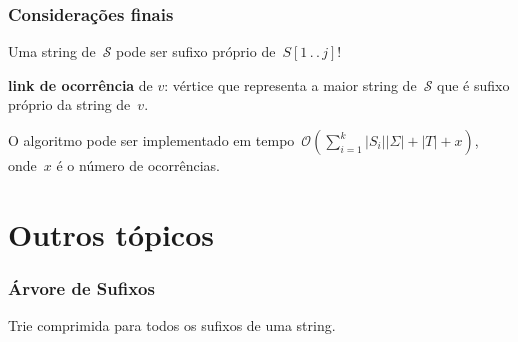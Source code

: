 \documentclass[10pt, compress]{beamer}
\newcommand{\tdots}{\,.\,.\,} %
\newcommand{\E}{\Sigma}
\newcommand{\Oh}{\mathcal{O}}
\newcommand{\cS}{\mathcal{S}}
\begin{document}
\begin{frame}[fragile]
\frametitle{Considerações finais}

Uma string de~$\cS$ pode ser sufixo \alert{próprio} de~$S[1\tdots j]$!

\textbf{link de ocorrência} de $v$: vértice que representa a maior string de~$\cS$ que é sufixo próprio da string de~$v$.

\pause

O algoritmo pode ser implementado em tempo~$\Oh(\sum\limits_{i=1}^k{|S_i||\E|} + |T| + x)$, onde~$x$ é o número de ocorrências.

\end{frame}

\section{Outros tópicos}

\begin{frame}[fragile]
\frametitle{Árvore de Sufixos}

Trie comprimida para todos os sufixos de uma string.

\begin{figure}
\centering
{}
\end{figure}
    
\end{frame}
\end{document}
